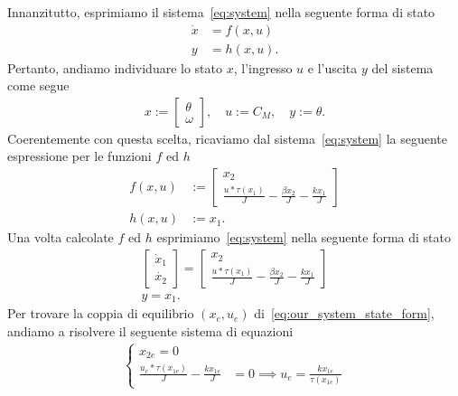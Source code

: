 \documentclass[a4paper, 11pt]{article}
\begin{document}
	Innanzitutto, esprimiamo il sistema~\eqref{eq:system} nella seguente forma di stato
	\begin{subequations}
		\begin{align}\label{eq:state_form}
			\dot{x} &= f(x,u)
			\\
			y &= h(x,u).
		\end{align}
	\end{subequations}
	Pertanto, andiamo individuare lo stato $x$, l'ingresso $u$ e l'uscita $y$ del sistema come segue 
	\begin{align*}
		x := \begin{bmatrix}
			\theta \\
			\omega
		\end{bmatrix}, \quad u := C_M, \quad y := \theta.
	\end{align*}
	Coerentemente con questa scelta, ricaviamo dal sistema~\eqref{eq:system} la seguente espressione per le funzioni $f$ ed $h$
	\begin{align*}
		f(x,u) &:= \begin{bmatrix}
			x_2 \\
			\frac{u*\tau(x_1)}{J}-\frac{\beta x_2}{J}-\frac{k x_1}{J}
		\end{bmatrix}
		\\
		h(x,u) &:= x_1.
	\end{align*}
	Una volta calcolate $f$ ed $h$ esprimiamo~\eqref{eq:system} nella seguente forma di stato
	\begin{subequations}\label{eq:our_system_state_form}
		\begin{gather*}
			\begin{bmatrix}
				\dot{x}_1
				\\
				\dot{x_2}
			\end{bmatrix} = \begin{bmatrix}
				x_2 \\
				\frac{u*\tau(x_1)}{J}-\frac{\beta x_2}{J}- \frac{k x_1}{J}
			\end{bmatrix} \label{eq:state_form_1}
			\\ 
			y = x_1.
		\end{gather*}
	\end{subequations}
	Per trovare la coppia di equilibrio $(x_e, u_e)$ di~\eqref{eq:our_system_state_form}, andiamo a risolvere il seguente sistema di equazioni
	\begin{align}
		\begin{cases}
			x_{2e} = 0 \\
			\frac{u_e*\tau(x_{1e})}{J} - \frac{k x_{1e} } {J} &= 0 \implies u_e = \frac{k x_{1e}}{\tau(x_{1e})}
		\end{cases}
	\end{align}
\end{document}
